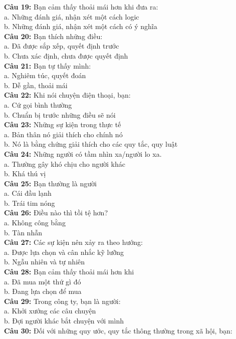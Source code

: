\begin{multicols}{2}
\textbf{Câu 19:} Bạn cảm thấy thoải mái hơn khi đưa ra: \\
a. Những đánh giá, nhận xét một cách logic \\
b. Những đánh giá, nhận xét một cách có ý nghĩa \\
\textbf{Câu 20:} Bạn thích những điều: \\
a. Đã được sắp xếp, quyết định trước \\
b. Chưa xác định, chưa được quyết định \\
\textbf{Câu 21:} Bạn tự thấy mình: \\
a. Nghiêm túc, quyết đoán \\
b. Dễ gần, thoải mái \\
\textbf{Câu 22:} Khi nói chuyện điện thoại, bạn: \\
a. Cứ gọi bình thường \\
b. Chuẩn bị trước những điều sẽ nói \\
\textbf{Câu 23:} Những sự kiện trong thực tế \\
a. Bản thân nó giải thích cho chính nó \\
b. Nó là bằng chứng giải thích cho các quy tắc, quy luật \\
\textbf{Câu 24:} Những người có tầm nhìn xa/người lo xa. \\
a. Thường gây khó chịu cho người khác \\
b. Khá thú vị \\
\textbf{Câu 25:} Bạn thường là người \\
a. Cái đầu lạnh \\
b. Trái tim nóng \\
\textbf{Câu 26:} Điều nào thì tồi tệ hơn? \\
a. Không công bằng \\
b. Tàn nhẫn \\
\textbf{Câu 27:} Các sự kiện nên xảy ra theo hướng: \\
a. Được lựa chọn và cân nhắc kỹ lưỡng \\
b. Ngẫu nhiên và tự nhiên \\
\textbf{Câu 28:} Bạn cảm thấy thoải mái hơn khi \\
a. Đã mua một thứ gì đó \\
b. Đang lựa chọn để mua \\
\textbf{Câu 29:} Trong công ty, bạn là người: \\
a. Khởi xướng các câu chuyện \\
b. Đợi người khác bắt chuyện với mình \\
\textbf{Câu 30:} Đối với những quy ước, quy tắc thông thường trong xã hội, bạn: \\

\end{multicols}
